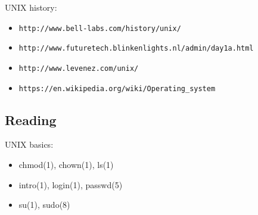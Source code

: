 \documentclass[xga]{xdvislides}
\begin{document}
UNIX history:
\begin{itemize}
	\item \verb+http://www.bell-labs.com/history/unix/+
	\item \verb+http://www.futuretech.blinkenlights.nl/admin/day1a.html+
	\item \verb+http://www.levenez.com/unix/+
	\item \verb+https://en.wikipedia.org/wiki/Operating_system+
\end{itemize}

\subsection{Reading}
UNIX basics:
\begin{itemize}
	\item chmod(1), chown(1), ls(1)
	\item intro(1), login(1), passwd(5)
	\item su(1), sudo(8)
\end{itemize}

%
%
\end{document}
